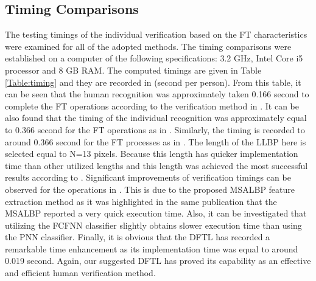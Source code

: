 \documentclass[conference]{IEEEtran}
\begin{document}
\subsection{Timing Comparisons}
The testing timings of the individual verification based on the FT characteristics were examined for all of the adopted methods. The timing comparisons were established on a computer of the following specifications: 3.2 GHz, Intel Core i5 processor and 8 GB RAM. The computed timings are given in Table \ref{Table:timing} and they are recorded in (second per person). From this table, it can be seen that the human recognition was approximately taken 0.166 second to complete the FT operations according to the verification method in \cite{Al-Nima2015Human}. It can be also found that the timing of the individual recognition was approximately equal to 0.366 second for the FT operations as in \cite{Al-Nima2016Robust}. Similarly, the timing is recorded to around 0.366 second for the FT processes as in \cite{Al-Nima2017efficient}. The length of the LLBP here is selected equal to N=13 pixels. Because this length has quicker implementation time than other utilized lengths \cite{Al-Nima2017Signal} and this length was achieved the most successful results according to \cite{Al-Nima2017efficient}. Significant improvements of verification timings can be observed for the operations in \cite{Al-Nima2017finger}. This is due to the proposed MSALBP feature extraction method as it was highlighted in the same publication that the MSALBP reported a very quick execution time. Also, it can be investigated that utilizing the FCFNN classifier slightly obtains slower execution time than using the PNN classifier. Finally, it is obvious that the DFTL has recorded a remarkable time enhancement as its implementation time was equal to around 0.019 second. Again, our suggested DFTL has proved its capability as an effective and efficient human verification method. 
\end{document}
